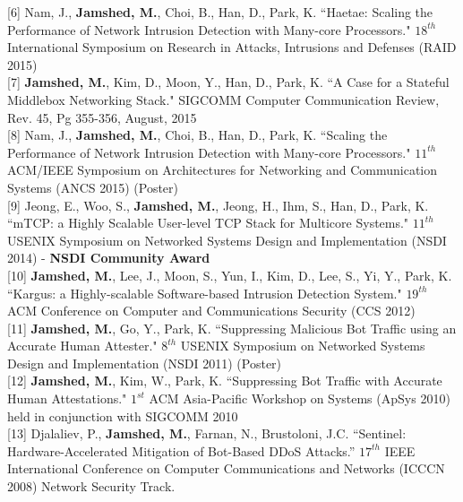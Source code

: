 \documentclass[10pt]{article}
\begin{document}
[6] Nam, J., {\bf Jamshed, M.}, Choi, B., Han, D., Park, K.
{ ``Haetae: Scaling the Performance of Network Intrusion Detection with Many-core Processors." }
    $18^{th}$ International Symposium on Research in Attacks, Intrusions and Defenses (RAID 2015)\\

[7] {\bf Jamshed, M.}, Kim, D., Moon, Y., Han, D., Park, K.
{ ``A Case for a Stateful Middlebox Networking Stack." }
    SIGCOMM Computer Communication Review, Rev. 45, Pg 355-356, August, 2015\\

[8] Nam, J., {\bf Jamshed, M.}, Choi, B., Han, D., Park, K.
{ ``Scaling the Performance of Network Intrusion Detection with Many-core Processors." }
    $11^{th}$ ACM/IEEE Symposium on Architectures for Networking and Communication Systems 
   (ANCS 2015) (Poster)\\

[9] Jeong, E., Woo, S., {\bf Jamshed, M.}, Jeong, H., Ihm, S., Han, D., Park, K.
{ ``mTCP: a Highly Scalable User-level TCP Stack for Multicore Systems." }
    $11^{th}$ USENIX Symposium on Networked Systems Design and Implementation 
   (NSDI 2014) - {\bf NSDI Community Award}\\

[10] {\bf Jamshed, M.}, Lee, J., Moon, S., Yun, I., Kim, D., Lee, S., Yi, Y., Park, K.
{ ``Kargus: a Highly-scalable Software-based Intrusion Detection System." }
    $19^{th}$ ACM Conference on Computer and Communications Security (CCS 2012) \\

[11] {\bf Jamshed, M.}, Go, Y., Park, K.
{ ``Suppressing Malicious Bot Traffic using an Accurate Human Attester." }
     $8^{th}$ USENIX Symposium on Networked Systems Design and Implementation (NSDI 2011) 
     (Poster)\\
     
[12] {\bf Jamshed, M.}, Kim, W., Park, K. 
     { ``Suppressing Bot Traffic with Accurate Human Attestations." }
     $1^{st}$ ACM Asia-Pacific Workshop on Systems (ApSys 2010) 
     held in conjunction with SIGCOMM 2010\\

[13] Djalaliev, P., {\bf Jamshed, M.}, Farnan, N., Brustoloni, J.C. 
	    {``Sentinel: Hardware-Accelerated Mitigation of Bot-Based DDoS Attacks.''}
	  $17^{th}$ IEEE International Conference on Computer Communications and Networks (ICCCN 2008)
          Network Security Track. \\
\end{document}
